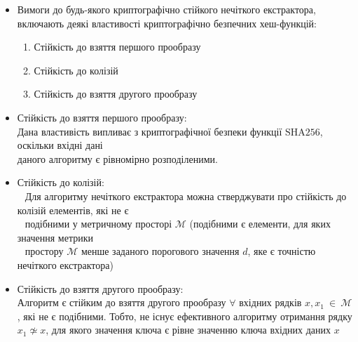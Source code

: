 \documentclass[11pt]{article}
\providecommand{\tightlist}{%
      \setlength{\itemsep}{0pt}\setlength{\parskip}{0pt}}
\begin{document}
\begin{enumerate}
  \begin{itemize}
  \tightlist
  \item
    Вимоги до будь-якого криптографічно стійкого нечіткого екстрактора,
    включають деякі властивості
    криптографічно безпечних хеш-функцій:

    \begin{enumerate}
    \def\labelenumii{\arabic{enumii}.}
    \tightlist
    \item
      Стійкість до взяття першого прообразу
    \item
      Стійкість до колізій
    \item
      Стійкість до взяття другого прообразу
    \end{enumerate}
  \item
    Стійкість до взяття першого прообразу:\\
    Дана властивість випливає з криптографічної безпеки функції
    \(\text{SHA256}\), оскільки вхідні дані\\
    даного алгоритму є рівномірно розподіленими.
  \item
    Стійкість до колізій:\\
    \(~~\) Для алгоритму нечіткого екстрактора можна стверджувати про
    стійкість до колізій елементів, які не є\\
    \(~~\) подібними у метричному просторі \(\mathcal{M}\) (подібними є
    елементи, для яких значення метрики\\
    \(~~\) простору \(\mathcal{M}\) менше заданого порогового значення
    \(d\), яке є точністю нечіткого екстрактора)
  \item
    Стійкість до взяття другого прообразу:\\
    Алгоритм є стійким до взяття другого прообразу \(\forall\) вхідних
    рядків \(x,x_1~\in~\mathcal{M}\), які не є подібними. Тобто, не
    існує ефективного алгоритму отримання рядку \(x_1 \not \simeq x\),
    для якого значення ключа є рівне значенню ключа вхідних даних \(x\)
  \end{itemize}
\end{enumerate}
\end{document}
